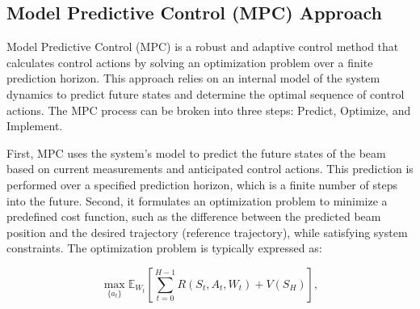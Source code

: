 \documentclass[journal,article,submit,pdftex,moreauthors]{Definitions/mdpi}
\begin{document}
\subsection{Model Predictive Control (MPC) Approach}

Model Predictive Control (MPC) is a robust and adaptive control method that calculates control actions by solving an optimization problem over a finite prediction horizon. This approach relies on an internal model of the system dynamics to predict future states and determine the optimal sequence of control actions. The MPC process can be broken into three steps: Predict, Optimize, and Implement.

First, MPC uses the system's model to predict the future states of the beam based on current measurements and anticipated control actions. This prediction is performed over a specified prediction horizon, which is a finite number of steps into the future. Second, it formulates an optimization problem to minimize a predefined cost function, such as the difference between the predicted beam position and the desired trajectory (reference trajectory), while satisfying system constraints. The optimization problem is typically expressed as:

\[
\max_{\{a_t\}} \mathbb{E}_{W_t} \left[ \sum_{t=0}^{H-1} R(S_t, A_t, W_t) + V(S_H) \right],
\]
\end{document}
